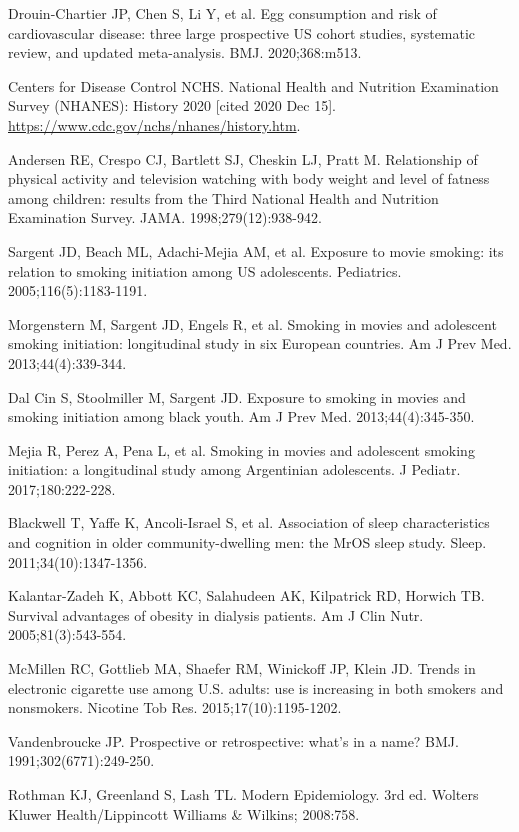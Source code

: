 \begingroup\sloppy
\begin{references}
\item Drouin-Chartier JP, Chen S, Li Y, et al. Egg consumption and risk of cardiovascular disease: three large prospective US cohort studies, systematic review, and updated meta-analysis. BMJ. 2020;368:m513.
\item Centers for Disease Control NCHS. National Health and Nutrition Examination Survey (NHANES): History 2020 [cited 2020 Dec 15]. \url{https://www.cdc.gov/nchs/nhanes/history.htm}.
\item Andersen RE, Crespo CJ, Bartlett SJ, Cheskin LJ, Pratt M. Relationship of physical activity and television watching with body weight and level of fatness among children: results from the Third National Health and Nutrition Examination Survey. JAMA. 1998;279(12):938-942.
\item Sargent JD, Beach ML, Adachi-Mejia AM, et al. Exposure to movie smoking: its relation to smoking initiation among US adolescents. Pediatrics. 2005;116(5):1183-1191.
\item Morgenstern M, Sargent JD, Engels R, et al. Smoking in movies and adolescent smoking initiation: longitudinal study in six European countries. Am J Prev Med. 2013;44(4):339-344.
\item Dal Cin S, Stoolmiller M, Sargent JD. Exposure to smoking in movies and smoking initiation among black youth. Am J Prev Med. 2013;44(4):345-350.
\item Mejia R, Perez A, Pena L, et al. Smoking in movies and adolescent smoking initiation: a longitudinal study among Argentinian adolescents. J Pediatr. 2017;180:222-228.
\item Blackwell T, Yaffe K, Ancoli-Israel S, et al. Association of sleep characteristics and cognition in older community-dwelling men: the MrOS sleep study. Sleep. 2011;34(10):1347-1356.
\item Kalantar-Zadeh K, Abbott KC, Salahudeen AK, Kilpatrick RD, Horwich TB. Survival advantages of obesity in dialysis patients. Am J Clin Nutr. 2005;81(3):543-554.
\item McMillen RC, Gottlieb MA, Shaefer RM, Winickoff JP, Klein JD. Trends in electronic cigarette use among U.S. adults: use is increasing in both smokers and nonsmokers. Nicotine Tob Res. 2015;17(10):1195-1202.
\item Vandenbroucke JP. Prospective or retrospective: what’s in a name? BMJ. 1991;302(6771):249-250.
\item Rothman KJ, Greenland S, Lash TL. Modern Epidemiology. 3rd ed. Wolters Kluwer Health/Lippincott Williams \& Wilkins; 2008:758.

\end{references}
